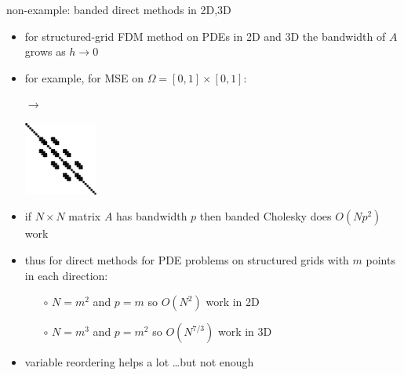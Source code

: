 \documentclass[hide notes,intlimits,usenames,dvipsnames]{beamer}
\begin{document}
\begin{frame}{non-example:  banded direct methods in 2D,3D}
\begin{itemize}
\item for structured-grid FDM method on PDEs in 2D and 3D the bandwidth of $A$ grows as $h\to 0$
\item for example, for MSE on $\Omega=[0,1]\times[0,1]$:

\begin{center}
\begin{tikzpicture}[scale=1.6,baseline]  \end{tikzpicture} \qquad \begin{minipage}[b]{5mm} $\to$ \vspace{10mm} \end{minipage} \qquad \includegraphics[width=0.19\textwidth]{figs/spybanded}
\end{center}

\item if $N\times N$ matrix $A$ has bandwidth $p$ then banded Cholesky does $O(N p^2)$ work
\item thus for direct methods for PDE problems on structured grids with $m$ points in each direction:
	\begin{itemize}
	\item[$\circ$] $N=m^2$ and $p=m$ so $O(N^2)$ work in 2D
	\item[$\circ$] $N=m^3$ and $p=m^2$ so $O(N^{7/3})$ work in 3D
	\end{itemize}
\item variable reordering helps a lot \dots but not enough
\end{itemize}
\end{frame}
\end{document}
